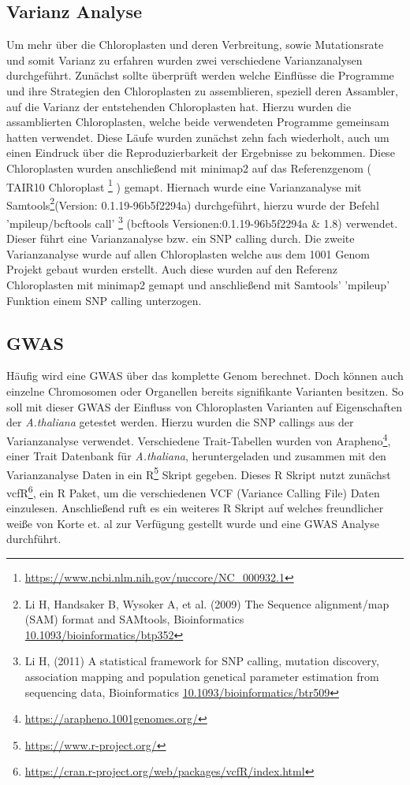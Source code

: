 \documentclass{scrartcl}
\begin{document}
\subsection{Varianz Analyse}
\label{sec-3-3}
Um mehr über die Chloroplasten und deren Verbreitung, sowie Mutationsrate und somit Varianz zu erfahren wurden zwei verschiedene Varianzanalysen durchgeführt. 
Zunächst sollte überprüft werden welche Einflüsse die Programme und ihre Strategien den Chloroplasten zu assemblieren, speziell deren Assambler, auf die Varianz der 
entstehenden Chloroplasten hat. Hierzu wurden die assamblierten Chloroplasten, welche beide verwendeten Programme gemeinsam hatten verwendet. Diese Läufe wurden zunächst
zehn fach wiederholt, auch um einen Eindruck über die Reproduzierbarkeit der Ergebnisse zu bekommen. Diese Chloroplasten wurden anschließend mit minimap2 \footnotemark[46]{} auf das 
Referenzgenom ( TAIR10 Chloroplast \footnote{\url{https://www.ncbi.nlm.nih.gov/nuccore/NC_000932.1}} ) gemapt. Hiernach wurde eine Varianzanalyse mit Samtools\footnote{Li H, Handsaker B, Wysoker A, et al. (2009) The Sequence alignment/map (SAM) format and SAMtools, Bioinformatics \url{10.1093/bioinformatics/btp352}}(Version: 0.1.19-96b5f2294a) durchgeführt, hierzu wurde der Befehl
'mpileup/bcftools call' \footnote{Li H, (2011) A statistical framework for SNP calling, mutation discovery, association mapping and population genetical parameter estimation from sequencing data, Bioinformatics  \url{10.1093/bioinformatics/btr509}} (bcftools Versionen:0.1.19-96b5f2294a \& 1.8) verwendet. Dieser führt eine Varianzanalyse bzw. ein SNP calling durch. Die zweite Varianzanalyse wurde auf allen Chloroplasten welche aus dem
1001 Genom Projekt gebaut wurden erstellt. Auch diese wurden auf den Referenz Chloroplasten mit minimap2 gemapt und anschließend mit Samtools' 'mpileup' Funktion einem
SNP calling unterzogen. 

\subsection{GWAS}
\label{sec-3-4}
Häufig wird eine GWAS über das komplette Genom berechnet. Doch können auch einzelne Chromosomen oder Organellen bereits signifikante Varianten besitzen. 
So soll mit dieser GWAS der Einfluss von Chloroplasten Varianten auf Eigenschaften der \emph{A.thaliana} getestet werden. Hierzu wurden die SNP callings aus der Varianzanalyse verwendet.
Verschiedene Trait-Tabellen wurden von Arapheno\footnote{\url{https://arapheno.1001genomes.org/}}, einer Trait Datenbank für \emph{A.thaliana}, heruntergeladen und zusammen mit den Varianzanalyse Daten in ein R\footnote{\url{https://www.r-project.org/}} Skript gegeben.
Dieses R Skript nutzt zunächst vcfR\footnote{\url{https://cran.r-project.org/web/packages/vcfR/index.html}}, ein R Paket, um die verschiedenen VCF (Variance Calling File) Daten einzulesen. Anschließend ruft es ein weiteres R Skript auf welches
freundlicher weiße von Korte et. al\footnotemark[39]{} zur Verfügung gestellt wurde und eine GWAS Analyse durchführt.
\end{document}
